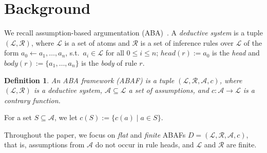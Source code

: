 \documentclass[letterpaper]{article} %
\newcommand{\suth}{s.t.\, }
\newcommand{\asms}{\asm}
\newcommand{\lit}{\ensuremath{\mathcal{L}}}
\newcommand{\rules}{\ensuremath{\mathcal{R}}}
\newcommand{\asm}{\ensuremath{\mathcal{A}}}
\newcommand{\atoms}{\mathcal{L}}
\newcommand{\ruleset}{\mathcal{R}}
\newcommand{\assumptions}{\mathcal{A}}
\newcommand{\contra}{c}
\newcommand{\contrary}[1]{c(#1)}
\newcommand{\contraryempty}{c}
\newcommand{\ABAdef}{D=(\atoms,\ruleset,\assumptions,\contra)}
\newtheorem{definition}[example]{Definition}
\begin{document}

       






\section{Background}
\label{sec:background}


We recall assumption-based argumentation (ABA)~\cite{BondarenkoDKT97,CyrasFST2018}. A \emph{deductive system} is a tuple $(\lit,\rules)$, where  
$\lit$ is a set of atoms and 
$\rules$ is a set of inference rules over $\lit$ of the form
$a_0 \leftarrow a_1,\ldots,a_n$, \suth $a_i \in \lit$ for all $0\leq i\leq n$; $head(r) := a_0$ is the \emph{head} and $body(r) := \{a_1,\ldots,a_n\}$ is the \emph{body} of rule $r$. 

\begin{definition}
	An ABA framework (ABAF) is a tuple $(\lit,\rules,\asm,\contraryempty)$, where $(\lit,\rules)$ is a deductive system, $\asm \subseteq \lit$ a set of \emph{assumptions}, and  
	$\contraryempty:\asm\rightarrow \lit$ is a \emph{contrary function}.
\end{definition}
For a set $S\subseteq \asm$, we let  $\contrary{S}:=\{\contrary{a}\mid a\in S\}$.

Throughout the paper, we focus on \emph{flat} and \emph{finite} ABAFs $\ABAdef$, that is, assumptions from $\asms$ do not occur in rule heads, and $\lit$ and $\rules$ are finite.%

\end{document}
